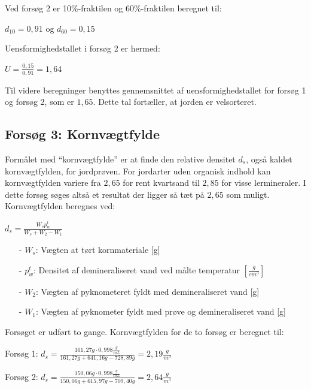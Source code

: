 Ved forsøg 2 er 10\%-fraktilen og 60\%-fraktilen beregnet til:
\begin{center}
	$d_{10} = 0,\!91$ og $d_{60} = 0,\!15$
\end{center} 

Uensformighedstallet i forsøg 2 er hermed:
\begin{center}
	$U = \frac{0,\!15}{0,\!91} = 1,\!64$
\end{center}

Til videre beregninger benyttes gennemsnittet af uensformighedstallet for forsøg 1 og forsøg 2, som er $1,\!65$. Dette tal fortæller, at jorden er velsorteret. 

\subsection{Forsøg 3: Kornvægtfylde}
Formålet med “kornvægtfylde” er at finde den relative densitet $d_s$, også kaldet kornvægtfylden, for jordprøven. For jordarter uden organisk indhold kan kornvægtfylden variere fra $2,\!65$ for rent kvartsand til $2,\!85$ for visse lermineraler. I dette forsøg søges altså et resultat der ligger så tæt på $2,\!65$ som muligt.
\newline
\newline
Kornvægtfylden beregnes ved:

\begin{center}
	$d_s = \frac{W_s p_w^t}{W_s + W_2 - W_1}$
\end{center}

\begin{itemize}
	\item[-] $W_s$: Vægten at tørt kornmateriale [g]
	\item[-] $p_w^t$: Densitet af demineraliseret vand ved målte temperatur $[\frac{g}{cm^3}]$
	\item[-] $W_2$: Vægten af pyknometeret fyldt med demineraliseret vand [g]
	\item[-] $W_1$: Vægten af pyknometer fyldt med prøve og demineraliseret vand [g]
\end{itemize}

Forsøget er udført to gange. Kornvægtfylden for de to forsøg er beregnet til:

\begin{center}
	Forsøg 1: $d_{s} = \frac{161,\!27 g \cdot 0,\!998 \frac{g}{mL}}{161,\!27 g + 641,\!16 g - 728,\!89 g} = 2,\!19 \frac{g}{m^3}$
\end{center}
\begin{center}
	Forsøg 2: $d_{s} = \frac{150,\!06 g \cdot 0,\!998 \frac{g}{mL}}{150,\!06 g + 615,\!97 g - 709,\!40 g} = 2,\!64 \frac{g}{m^3}$
\end{center} 

